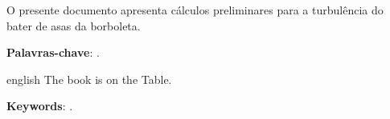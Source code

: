 \documentclass[12pt,openright,oneside,a4paper,english,brazil,oficial]{iaeRT}
\begin{document}
\def\PalavrasChaveIndexacao{Índio, Rede, Borboleta}

\def\ArquivoEletronico{123-000000-X0010.pdf}

\def\CodSIGTEC{}

\def\Observacoes{}

\def\Resumo{O presente documento apresenta cálculos preliminares para a turbulência do bater de asas da borboleta.}

\def\Abstract{The book is on the Table.}

\def\Projeto{BRB01}
\def\InicioCodigo{123} 
\def\nivelSuperior{Não há}
\def\nivelInferior{Não há}



\frenchspacing 

\imprimircapa
\setcounter{page}{1}
\imprimirfolhaidentificacao

\setlength{\absparsep}{18pt} %
\begin{resumo}[Resumo]
 \Resumo

 \textbf{Palavras-chave}: \PalavrasChave.
\end{resumo}%
\begin{resumo}[Abstract]
 \begin{otherlanguage*}{english}
   \Abstract
 
   \noindent 
   \textbf{Keywords}: \Keywords.
 \end{otherlanguage*}
\end{resumo}\newpage
\listoffigures*
\cleardoublepage

\listoftables*
\cleardoublepage
\tableofcontents*
\cleardoublepage


\textual

\end{document}

